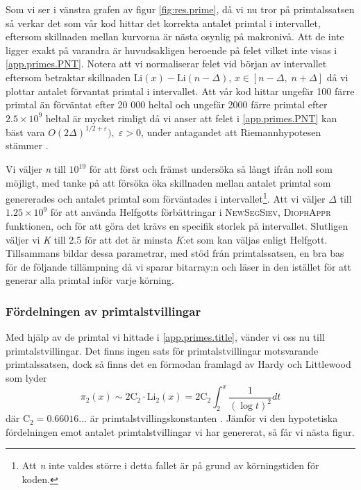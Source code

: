 Som vi ser i vänstra grafen av figur \ref{fig:res.prime}, då vi nu tror på primtalssatsen så verkar det som vår kod hittar det korrekta antalet primtal i intervallet, eftersom skillnaden mellan kurvorna är nästa osynlig på makronivå. 
Att de inte ligger exakt på varandra är huvudsakligen beroende på felet vilket inte visas i \eqref{app.primes.PNT}.
Notera att vi normaliserar felet vid början av intervallet eftersom betraktar skillnaden \(\text{Li}(x) - \text{Li}(n - \Delta)\), \(x\in[n-\Delta,\; n+\Delta]\) då vi plottar antalet förvantat primtal i intervallet.
Att vår kod hittar ungefär 100 färre primtal än förväntat efter 20 000 heltal och ungefär 2000 färre primtal efter \(2.5\times10^9\) heltal är mycket rimligt då vi anser att felet i \eqref{app.primes.PNT} kan bäst vara \(O(2\Delta)^{1/2 + \varepsilon}),\; \varepsilon > 0\), under antagandet att Riemannhypotesen stämmer \cite[Kapitel 5]{RiemannErr}.

Vi väljer \textit{n} till \(10^{19}\) för att först och främst undersöka så långt ifrån noll som möjligt, med tanke på att försöka öka skillnaden mellan antalet primtal som genererades och antalet primtal som förväntades i intervallet\footnote{Att \textit{n} inte valdes större i detta fallet är på grund av körningstiden för koden.}.
Att vi väljer \(\Delta\) till \(1.25\times10^9\) för att använda Helfgotts förbättringar i \textsc{NewSegSiev}, \textsc{DiophAppr} funktionen, och för att göra det krävs en specifik storlek på intervallet.
Slutligen väljer vi \textit{K} till 2.5 för att det är minsta \textit{K}:et som kan väljas enligt Helfgott.
Tillsammans bildar dessa parametrar, med stöd från primtalssatsen, en bra bas för de följande tillämpning då vi sparar bitarray:n och läser in den istället för att generar alla primtal inför varje körning.

\subsubsection{Fördelningen av primtalstvillingar}

Med hjälp av de primtal vi hittade i \ref{app.primes.title}, vänder vi oss nu till primtalstvillingar. Det finns ingen sats för primtalstvillingar motsvarande primtalssatsen, dock så finns det en förmodan framlagd av Hardy och Littlewood \cite[Förmodan B]{Hardy} som lyder
\begin{equation}
    \pi_2(x) \sim 2\text{C}_2\cdot \text{Li}_2(x) = 2\text{C}_2\int_2^x\frac{1}{(\log t)^2}dt\label{app.twins.TWN}
\end{equation}
där \(\text{C}_2 = 0.66016...\) är primtalstvillingskonstanten \cite{TwinPrimeConstant}. Jämför vi den hypotetiska fördelningen emot antalet primtalstvillingar vi har genererat, så får vi nästa figur.

